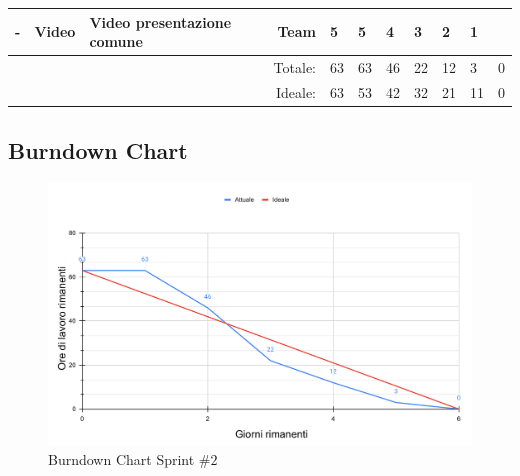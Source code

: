 \begin{longtable}{p{0.5cm}|p{2.7cm}|p{4.5cm}|p{1.7cm}|p{1.5cm}|p{0.2cm}|p{0.2cm}|p{0.2cm}|p{0.2cm}|p{0.2cm}|p{0.2cm}}
    \multirow{1}{0.2cm}{-} & \multirow{1}{0.2cm}{Video}
    & Video presentazione comune & Team & 5 & 5 &4& 3& 2&1 & \\

    
    \hline
    \hline
    \hline
    \multicolumn{4}{r|}{Totale: }& 63&63&46&22&12&3&0\\
    
    \hline
    \multicolumn{4}{r|}{Ideale: }& 63&53&42&32&21&11&0\\
    
    

\end{longtable}
\restoregeometry

\newpage
\subsection{Burndown Chart}

\begin{figure}[!ht]
    \centering
    \includegraphics[trim= 0cm 0cm 0cm 0cm, clip, width=1\linewidth]{Deliverables/fourth-deliverable/img/BurndownChart.pdf}
    \caption{Burndown Chart Sprint \#$2$}
\end{figure}






